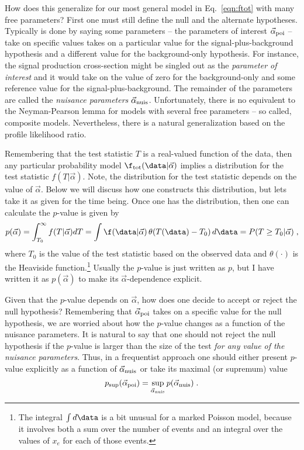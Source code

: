 How does this generalize for our most general model in Eq.~\ref{eqn:ftot} with many free parameters?  First one must still define the null and the alternate hypotheses.  Typically is done by saying some parameters -- the parameters of interest $\vec\alpha_{\rm poi}$ --  take on specific values takes on a particular value for the signal-plus-background hypothesis and a different value for the background-only hypothesis.  For instance, the signal production cross-section might be singled out as the \textit{parameter of interest} and it would take on the value of zero for the background-only and some reference value for the signal-plus-background.  The remainder of the parameters are called the \textit{nuisance parameters} $\vec\alpha_{\rm nuis}$.  Unfortunately, there is no equivalent to the Neyman-Pearson lemma for models with several free parameters -- so called, composite models.  Nevertheless, there is a natural generalization based on the profile likelihood ratio.


Remembering that the test statistic $T$ is a real-valued function of the data, then any particular probability model $\f_{\rm tot}(\data|\vec\alpha)$ implies a distribution for the test statistic $f(T|\vec\alpha)$.  Note, the distribution for the test statistic depends on the value of $\vec\alpha$.  Below we will discuss how one constructs this distribution, but lets take it as given for the time being.  Once one has the distribution, then one can calculate the $p$-value is given by
\begin{equation}
p(\vec\alpha) = \int_{T_0}^\infty f(T | \vec\alpha) dT = \int  \f(\data | \vec\alpha )\, \theta(T(\data) - T_0) \,d\data = P(T\ge T_0 | \vec\alpha) \;,
\end{equation}
where $T_0$ is the value of the test statistic based on the observed data and $\theta( \cdot )$ is the Heaviside function.\footnote{The integral $\int d\data$ is a bit unusual for a marked Poisson model, because it involves both a sum over the number of events and an integral over the values of $x_e$ for each of those events.} Usually the $p$-value is just written as $p$, but I have written it as $p(\vec\alpha)$ to make its  $\vec\alpha$-dependence explicit.  


Given that the $p$-value depends on $\vec\alpha$, how does one decide to accept or reject the null hypothesis?  Remembering that $\vec\alpha_{\rm poi}$ takes on a specific value for the null hypothesis, we are worried about how the $p$-value changes as a function of the nuisance parameters.  It is natural to say that one should not reject the null hypothesis if the $p$-value is larger than the size of the test \textit{for any value of the nuisance parameters}.  Thus, in a frequentist approach one should either present $p$-value explicitly as a function of $\vec{\alpha}_{\rm nuis}$ or take its maximal (or supremum) value 
\begin{equation}
p_{\rm sup}(\vec\alpha_{\rm poi}) = \sup_{ \vec{\alpha}_{\rm nuis}} p(\vec{\alpha}_{\rm nuis}) \; .
\end{equation}


